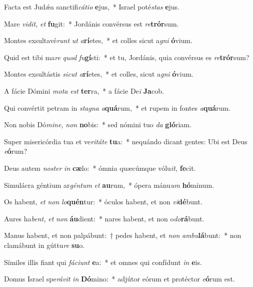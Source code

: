 \item Facta est Judǽa sanctifi\textit{cátio} \textbf{e}jus,~* Israel poté\tinyhspace\textit{stas} \textbf{e}jus.
\item Mare \textit{vidit,} \textit{et} \textbf{fu}git:~* Jordánis convérsus est \textit{re}\textbf{trór}sum.
\item Montes exsultavé\tinyhspace\textit{runt} \textit{ut} \textit{a}\textbf{rí}etes,~* et colles sicut a\textit{gni} \textbf{ó}vium.
\item Quid est tibi ma\tinyhspace\textit{re} \textit{quod} \textit{fu}\textbf{gí}sti:~* et tu, Jordánis, quia convérsus es \textit{re}\textbf{trór}sum?
\item Montes exsultástis \textit{sicut} \textit{a}\textbf{rí}etes,~* et colles, sicut a\textit{gni} \textbf{ó}vium.
\item A fácie Dómini \textit{mota} \textit{est} \textbf{ter}ra,~* a fácie De\textit{i} \textbf{Ja}cob.
\item Qui convértit petram in \textit{stagna} \textit{a}\textbf{quá}rum,~* et rupem in fontes \textit{a}\textbf{quá}rum.
\item Non nobis Dó\textit{mine,} \textit{non} \textbf{no}bis:~* sed nómini tuo \textit{da} \textbf{gló}riam.
\item Super misericórdia tua et ve\tinyhspace\textit{ritáte} \textbf{tu}a:~* nequándo dicant gentes: Ubi est Deus \textit{e}\textbf{ó}rum?
\item Deus autem \textit{noster} \textit{in} \textbf{cæ}lo:~* ómnia quæcúmque vólu\textit{it,} \textbf{fe}cit.
\item Simulácra géntium ar\textit{géntum} \textit{et} \textbf{au}rum,~* ópera mánu\textit{um} \textbf{hó}minum.
\item Os habent, \textit{et} \textit{non} \textit{lo}\textbf{quén}tur:~* óculos habent, et non \textit{vi}\textbf{dé}bunt.
\item Aures ha\tinyhspace\textit{bent,} \textit{et} \textit{non} \textbf{áu}dient:~* nares habent, et non o\textit{do}\textbf{rá}bunt.
\item Manus habent, et non palpábunt:~† pedes habent, et \textit{non} \textit{ambu}\textbf{lá}bunt:~* non clamábunt in gúttu\textit{re} \textbf{su}o.
\item Símiles illis fiant qui \textit{fáciunt} \textbf{e}a:~* et o\-mnes qui confídunt \textit{in} \textbf{e}is.
\item Domus Israel spe\tinyhspace\textit{rávit} \textit{in} \textbf{Dó}mino:~* adjútor eórum et protéctor \textit{e}\textbf{ó}rum est.
